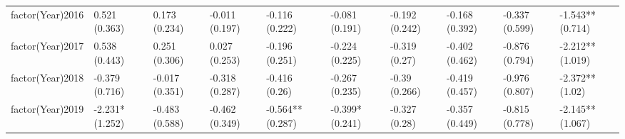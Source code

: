 \begin{table}[ht]
\begin{tabular}{llllllllll}
  factor(Year)2016 & 0.521 (0.363) & 0.173 (0.234) & -0.011 (0.197) & -0.116 (0.222) & -0.081 (0.191) & -0.192 (0.242) & -0.168 (0.392) & -0.337 (0.599) & -1.543** (0.714) \\ 
  factor(Year)2017 & 0.538 (0.443) & 0.251 (0.306) & 0.027 (0.253) & -0.196 (0.251) & -0.224 (0.225) & -0.319 (0.27) & -0.402 (0.462) & -0.876 (0.794) & -2.212** (1.019) \\ 
  factor(Year)2018 & -0.379 (0.716) & -0.017 (0.351) & -0.318 (0.287) & -0.416 (0.26) & -0.267 (0.235) & -0.39 (0.266) & -0.419 (0.457) & -0.976 (0.807) & -2.372** (1.02) \\ 
  factor(Year)2019 & -2.231* (1.252) & -0.483 (0.588) & -0.462 (0.349) & -0.564** (0.287) & -0.399* (0.241) & -0.327 (0.28) & -0.357 (0.449) & -0.815 (0.778) & -2.145** (1.067) \\ 
   \bottomrule
\end{tabular}
\endgroup
\end{table}
